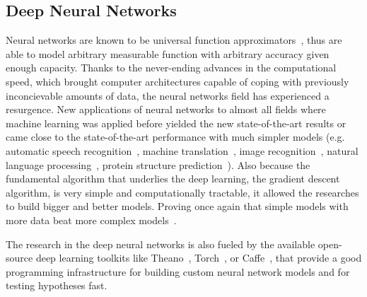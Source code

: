 \documentclass[10pt,twocolumn]{article}
\begin{document}
\subsection{Deep Neural Networks}
Neural networks are known to be universal function approximators~\cite{hornik1989multilayer}, thus are able to model arbitrary measurable function with arbitrary accuracy given enough capacity. Thanks to the never-ending advances in the computational speed, which brought computer architectures capable of coping with previously inconcievable amounts of data, the neural networks field has experienced a resurgence. New applications of neural networks to almost all fields where machine learning was applied before yielded the new state-of-the-art results or came close to the state-of-the-art performance with much simpler models (e.g. automatic speech recognition~\cite{graves2005framewise}, machine translation~\cite{sutskever2014sequence}, image recognition~\cite{karpathy2014deep}, natural language processing~\cite{socher2012semantic}, protein structure prediction~\cite{sonderby2014protein}). Also because the fundamental algorithm that underlies the deep learning, the gradient descent algorithm, is very simple and computationally tractable, it allowed the researches to build bigger and better models. Proving once again that simple models with more data beat more complex models~\cite{halevy2009unreasonable}.

The research in the deep neural networks is also fueled by the available open-source deep learning toolkits like Theano~\cite{bastien2012theano}, Torch~\cite{collobert2011torch7}, or Caffe~\cite{jia2014caffe}, that provide a good programming infrastructure for building custom neural network models and for testing hypotheses fast.
\end{document}
